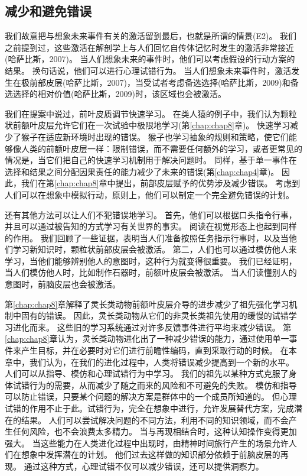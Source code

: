 \subsection{减少和避免错误}

我们故意把与想象未来事件有关的激活留到最后，也就是所谓的情景(E2)。
我们之前提到过，这些激活在解剖学上与人们回忆自传体记忆时发生的激活非常接近(哈萨比斯，2007)。
当人们想象未来的事件时，他们可以考虑假设的行动方案的结果。
换句话说，他们可以进行心理试错行为。
当人们想象未来事件时，激活发生在极前部皮层(哈萨比斯，2007)，当受试者考虑备选选择(哈萨比斯，2009)和备选选择的相对价值(哈萨比斯，2009)时，该区域也会被激活。


我们在提案中说过，前叶皮质调节快速学习。
在类人猿的例子中，我们认为颗粒状前额叶皮层允许它们在一次试验中极限地学习(第\ref{chap:chap8}章)。
快速学习减少了猴子在适应新环境时出现的错误。
猴子也学习抽象的规则和策略，使它们能够像人类的前额叶皮层一样：限制错误，而不需要任何额外的学习，或者更常见的情况是，当它们把自己的快速学习机制用于解决问题时。
同样，基于单一事件在选择和结果之间分配因果责任的能力减少了未来的错误(第\ref{chap:chap4}章)。
因此，我们在第\ref{chap:chap8}章中提出，前部皮层赋予的优势涉及减少错误。
考虑到人们可以在想象中模拟行动，原则上，他们可以制定一个完全避免错误的计划。


还有其他方法可以让人们不犯错误地学习。
首先，他们可以根据口头指令行事，并且可以通过被告知的方式学习有关世界的事实。
阅读在视觉形态上也起到同样的作用。
我们回顾了一些证据，表明当人们准备按照任务指示行事时，以及当他们学习新知识时，颗粒状前部皮层会被激活。
第二，人们也可以通过模仿他人来学习，当他们能够辨别他人的意图时，这种行为就变得很重要。
我们已经证明，当人们模仿他人时，比如制作石器时，前额叶皮层会被激活。
当人们读懂别人的意图时，前脑皮层也会被激活。


第\ref{chap:chap8}章解释了灵长类动物前额叶皮层介导的进步减少了祖先强化学习机制中固有的错误。
因此，灵长类动物从它们的非灵长类祖先使用的缓慢的试错学习进化而来。
这些旧的学习系统通过对许多反馈事件进行平均来减少错误。
第\ref{chap:chap8}章认为，灵长类动物进化出了一种减少错误的能力，通过使用单一事件来产生目标，并在必要时对它们进行前瞻性编码，直到采取行动的时候。
在本章中，我们认为，在我们的进化过程中，人类将错误减少提高到一个新的水平。
人们可以从指导、模仿和心理试错行为中学习。
我们的祖先以某种方式克服了身体试错行为的需要，从而减少了随之而来的风险和不可避免的失败。
模仿和指导可以防止错误，只要某个问题的解决方案是群体中的一个成员所知道的。
但心理试错的作用不止于此。试错行为，完全在想象中进行，允许发展替代方案，完成潜在的结果。
人们可以尝试解决问题的不同方法，利用不同的知识领域，而不会产生任何风险，也不会浪费太多精力。
当与再现相结合时，这种认知操作变得更加强大。
当这些能力在人类进化过程中出现时，由精神时间旅行产生的场景允许人们在想象中发挥潜在的计划。
他们过去这样做的知识部分依赖于前脑皮层的再现。
通过这种方式，心理试错不仅可以减少错误，还可以提供洞察力。


